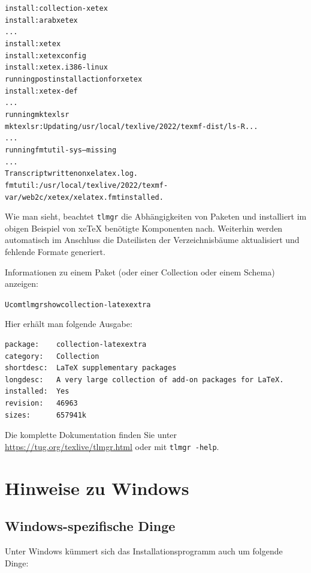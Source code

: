\documentclass[12pt,ngerman,a4paper,fullparskip]{report}
\newcommand{\prog}[1]{\texttt{#1}}
\providecommand*{\XeTeX}{xe\TeX\xspace}
\begin{document}
\begin{alltt}\small
install: collection-xetex
install: arabxetex
...
install: xetex
install: xetexconfig
install: xetex.i386-linux
running post install action for xetex
install: xetex-def
...
running mktexlsr
mktexlsr: Updating /usr/local/texlive/2022/texmf-dist/ls-R...
...
running fmtutil-sys --missing
...
Transcript written on xelatex.log.
fmtutil: /usr/local/texlive/2022/texmf-var/web2c/xetex/xelatex.fmt installed.
\end{alltt}

Wie man sieht, beachtet \prog{tlmgr} die Abhängigkeiten von Paketen und installiert im obigen Beispiel von \XeTeX{} benötigte Komponenten nach. Weiterhin werden automatisch im Anschluss die Dateilisten der Verzeichnisbäume aktualisiert und fehlende Formate generiert.

Informationen zu einem Paket (oder einer Collection oder einem Schema) anzeigen:

\begin{alltt}
Ucom{tlmgr show collection-latexextra}
\end{alltt}

Hier erhält man folgende Ausgabe:

\begin{verbatim}
package:    collection-latexextra
category:   Collection
shortdesc:  LaTeX supplementary packages
longdesc:   A very large collection of add-on packages for LaTeX.
installed:  Yes
revision:   46963
sizes:      657941k
\end{verbatim}

\noindent Die komplette Dokumentation finden Sie unter \url{https://tug.org/texlive/tlmgr.html}
oder mit \texttt{tlmgr -help}.

\chapter{Hinweise zu Windows}
\label{sec:windows}


\section{Windows-spezifische Dinge}
\label{sec:winfeatures}

Unter Windows kümmert sich das Installationsprogramm auch um folgende Dinge:
\end{document}
